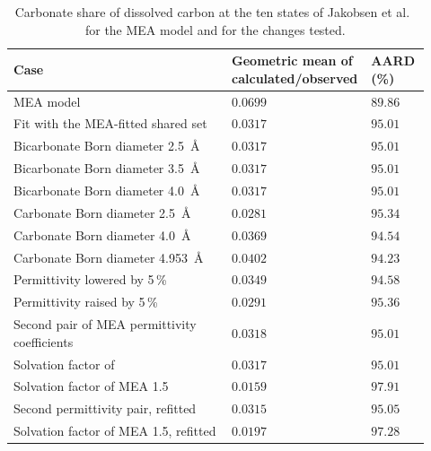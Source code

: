 \begin{table}[!htbp]\small\setlength{\tabcolsep}{2pt}\caption{Carbonate share of dissolved carbon at the ten states of Jakobsen et al.\ \cite{Jakobsen2005} for the MEA model and for the changes tested.}\label{tab:supplement-carbonate-sensitivity}
\begin{tabular}{@{}>{\raggedright\arraybackslash}p{0.52\linewidth}>{\raggedright\arraybackslash}p{0.26\linewidth}>{\raggedright\arraybackslash}p{0.14\linewidth}@{}}
\toprule Case & Geometric mean of calculated/observed & AARD (\%) \\ \midrule
MEA model & $0.0699$ & $89.86$ \\
Fit with the MEA-fitted shared set & $0.0317$ & $95.01$ \\
Bicarbonate Born diameter \SI{2.5}{\angstrom} & $0.0317$ & $95.01$ \\
Bicarbonate Born diameter \SI{3.5}{\angstrom} & $0.0317$ & $95.01$ \\
Bicarbonate Born diameter \SI{4.0}{\angstrom} & $0.0317$ & $95.01$ \\
Carbonate Born diameter \SI{2.5}{\angstrom} & $0.0281$ & $95.34$ \\
Carbonate Born diameter \SI{4.0}{\angstrom} & $0.0369$ & $94.54$ \\
Carbonate Born diameter \SI{4.953}{\angstrom} & $0.0402$ & $94.23$ \\
Permittivity lowered by 5\,\% & $0.0349$ & $94.58$ \\
Permittivity raised by 5\,\% & $0.0291$ & $95.36$ \\
Second pair of MEA permittivity coefficients & $0.0318$ & $95.01$ \\
Solvation factor of \COtwo 1.5 & $0.0317$ & $95.01$ \\
Solvation factor of MEA 1.5 & $0.0159$ & $97.91$ \\
Second permittivity pair, refitted & $0.0315$ & $95.05$ \\
Solvation factor of MEA 1.5, refitted & $0.0197$ & $97.28$ \\
\bottomrule\end{tabular}
\par{}\end{table}

